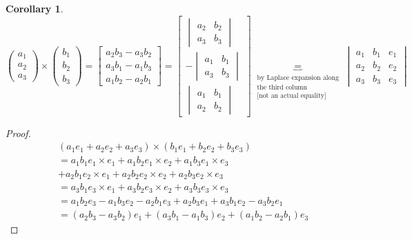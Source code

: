 \documentclass[a4paper]{article}
\newcounter{lecref}[section]
\numberwithin{lecref}{section}
\newtheorem{corollary}[lecref]{Corollary}
\begin{document}
\begin{corollary}
  \[
    \begin{pmatrix} a_1 \\ a_2 \\ a_3 \end{pmatrix}
    \times \begin{pmatrix} b_1 \\ b_2 \\ b_3 \end{pmatrix}
    = \begin{bmatrix} a_2 b_3 - a_3 b_2 \\ a_3 b_1 - a_1 b_3 \\ a_1 b_2 - a_2 b_1 \end{bmatrix}
    = \begin{bmatrix}
      \begin{vmatrix} a_2 & b_2 \\ a_3 & b_3 \end{vmatrix} \\
      -\begin{vmatrix} a_1 & b_1 \\ a_3 & b_3 \end{vmatrix} \\
      \begin{vmatrix} a_1 & b_1 \\ a_2 & b_2 \end{vmatrix}
    \end{bmatrix}
    \underbrace{=}_{\substack{\text{by Laplace expansion along} \\ \text{the third column} \\ \text{[not an actual equality]}}}
    \begin{vmatrix}
      a_1 & b_1 & e_1 \\
      a_2 & b_2 & e_2 \\
      a_3 & b_3 & e_3
    \end{vmatrix}
  \]
\end{corollary}

\begin{proof}
  \begin{align*}
      &(a_1 e_1 + a_2 e_2 + a_3 e_3) \times (b_1 e_1 + b_2 e_2 + b_3 e_3) \\
      &= a_1 b_1 e_1 \times e_1 + a_1 b_2 e_1 \times e_2 + a_1 b_3 e_1 \times e_3 \\
      &+ a_2 b_1 e_2 \times e_1 + a_2 b_2 e_2 \times e_2 + a_2 b_3 e_2 \times e_3 \\
      &= a_3 b_1 e_3 \times e_1 + a_3 b_2 e_3 \times e_2 + a_3 b_3 e_3 \times e_3 \\
      &= a_1 b_2 e_3 - a_1 b_3 e_2 - a_2 b_1 e_3 + a_2 b_3 e_1 + a_3 b_1 e_2 - a_3 b_2 e_1 \\
      &= (a_2 b_3 - a_3 b_2) e_1 + (a_3 b_1 - a_1 b_3) e_2 + (a_1 b_2 - a_2 b_1) e_3
  \end{align*}
\end{proof}
\end{document}
